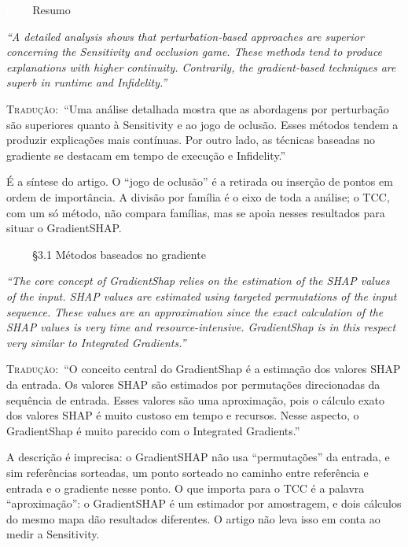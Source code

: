 \documentclass[11pt,a4paper]{article}
\newcommand{\pagechip}[1]{{\setlength{\fboxsep}{1.5pt}\colorbox{cAcc}{\textcolor{white}{\scriptsize\texttt{#1}}}}}
\newenvironment{origquote}{\par\itshape\small}{\par}
\newenvironment{tradquote}{\par\small\textsc{Tradução:}\ }{\par}
\newcommand{\explab}[1]{\par\smallskip{\small\color{cAcc}\textbf{\MakeUppercase{#1}}}\par}
\begin{document}
\begin{citacard}{\pagechip{p. 1} Resumo}
\begin{origquote}“A detailed analysis shows that perturbation-based approaches are superior concerning the Sensitivity and occlusion game. These methods tend to produce explanations with higher continuity. Contrarily, the gradient-based techniques are superb in runtime and Infidelity.”\end{origquote}
\begin{tradquote}“Uma análise detalhada mostra que as abordagens por perturbação são superiores quanto à Sensitivity e ao jogo de oclusão. Esses métodos tendem a produzir explicações mais contínuas. Por outro lado, as técnicas baseadas no gradiente se destacam em tempo de execução e Infidelity.”\end{tradquote}
\explab{Explicação}
É a síntese do artigo. O ``jogo de oclusão'' é a retirada ou inserção de pontos em ordem de importância. A divisão por família é o eixo de toda a análise; o TCC, com um só método, não compara famílias, mas se apoia nesses resultados para situar o GradientSHAP.
\end{citacard}

\begin{citacard}{\pagechip{p. 3} §3.1 Métodos baseados no gradiente}
\begin{origquote}“The core concept of GradientShap relies on the estimation of the SHAP values of the input. SHAP values are estimated using targeted permutations of the input sequence. These values are an approximation since the exact calculation of the SHAP values is very time and resource-intensive. GradientShap is in this respect very similar to Integrated Gradients.”\end{origquote}
\begin{tradquote}“O conceito central do GradientShap é a estimação dos valores SHAP da entrada. Os valores SHAP são estimados por permutações direcionadas da sequência de entrada. Esses valores são uma aproximação, pois o cálculo exato dos valores SHAP é muito custoso em tempo e recursos. Nesse aspecto, o GradientShap é muito parecido com o Integrated Gradients.”\end{tradquote}
\explab{Explicação}
A descrição é imprecisa: o GradientSHAP não usa ``permutações'' da entrada, e sim referências sorteadas, um ponto sorteado no caminho entre referência e entrada e o gradiente nesse ponto. O que importa para o TCC é a palavra ``aproximação'': o GradientSHAP é um estimador por amostragem, e dois cálculos do mesmo mapa dão resultados diferentes. O artigo não leva isso em conta ao medir a Sensitivity.
\end{citacard}
\end{document}
